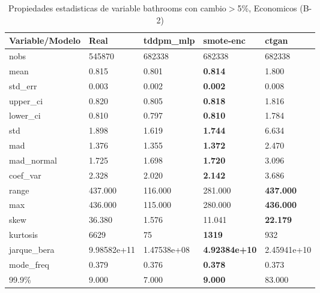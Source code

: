 \begin{table}[H]
\centering
\fontsize{8}{14}\selectfont
\caption{Propiedades estadisticas de variable bathrooms con cambio\ensuremath{>}5\%, Economicos (B-2)}
\label{table-stats-economicos-b-2-bathrooms-short}
\begin{tabular}{|l|m{10em}|m{10em}|m{10em}|m{10em}|}
\hline
 \rowcolor[gray]{0.8}
Variable/Modelo & Real & tddpm\_mlp & smote-enc & ctgan \\
\hline nobs & 545870 & 682338 & 682338 & 682338 \\
\hline mean & 0.815 & 0.801 & \bfseries 0.814 & \cellcolor[rgb]{0.9, 0.54, 0.52} 1.800 \\
\hline std\_err & 0.003 & 0.002 & \bfseries 0.002 & \cellcolor[rgb]{0.9, 0.54, 0.52} 0.008 \\
\hline upper\_ci & 0.820 & 0.805 & \bfseries 0.818 & \cellcolor[rgb]{0.9, 0.54, 0.52} 1.816 \\
\hline lower\_ci & 0.810 & 0.797 & \bfseries 0.810 & \cellcolor[rgb]{0.9, 0.54, 0.52} 1.784 \\
\hline std & 1.898 & 1.619 & \bfseries 1.744 & \cellcolor[rgb]{0.9, 0.54, 0.52} 6.634 \\
\hline mad & 1.376 & 1.355 & \bfseries 1.372 & \cellcolor[rgb]{0.9, 0.54, 0.52} 2.470 \\
\hline mad\_normal & 1.725 & 1.698 & \bfseries 1.720 & \cellcolor[rgb]{0.9, 0.54, 0.52} 3.096 \\
\hline coef\_var & 2.328 & 2.020 & \bfseries 2.142 & \cellcolor[rgb]{0.9, 0.54, 0.52} 3.686 \\
\hline range & 437.000 & \cellcolor[rgb]{0.9, 0.54, 0.52} 116.000 & 281.000 & \bfseries 437.000 \\
\hline max & 436.000 & \cellcolor[rgb]{0.9, 0.54, 0.52} 115.000 & 280.000 & \bfseries 436.000 \\
\hline skew & 36.380 & \cellcolor[rgb]{0.9, 0.54, 0.52} 1.576 & 11.041 & \bfseries 22.179 \\
\hline kurtosis & 6629 & \cellcolor[rgb]{0.9, 0.54, 0.52} 75 & \bfseries 1319 & 932 \\
\hline jarque\_bera & 9.98582e+11 & \cellcolor[rgb]{0.9, 0.54, 0.52} 1.47538e+08 & \bfseries 4.92384e+10 & 2.45941e+10 \\
\hline mode\_freq & 0.379 & 0.376 & \bfseries 0.378 & \cellcolor[rgb]{0.9, 0.54, 0.52} 0.373 \\
\hline 99.9\% & 9.000 & 7.000 & \bfseries 9.000 & \cellcolor[rgb]{0.9, 0.54, 0.52} 83.000 \\
\hline
\end{tabular}
\end{table}
